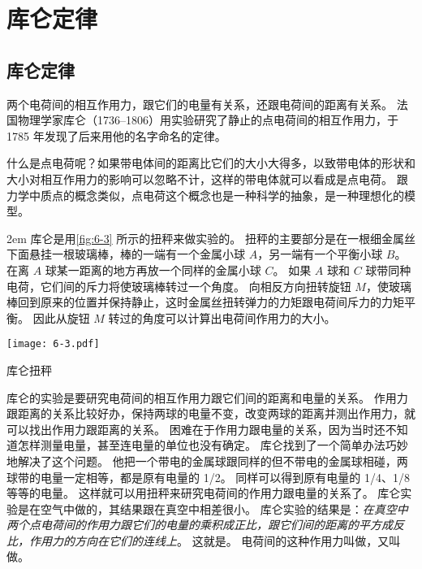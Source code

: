 \section{库仑定律}
\subsection{库仑定律} 
两个电荷间的相互作用力，跟它们的电量有关系，还跟电荷间的距离有关系。
法国物理学家库仑（1736--1806）用实验研究了静止的点电荷间的相互作用力，于 1785 年发现了后来用他的名字命名的定律。

什么是点电荷呢？如果带电体间的距离比它们的大小大得多，以致带电体的形状和大小对相互作用力的影响可以忽略不计，这样的带电体就可以看成是点电荷。
跟力学中质点的概念类似，点电荷这个概念也是一种科学的抽象，是一种理想化的模型。

\medskip\noindent
\begin{minipage}{0.55\linewidth}\parindent2em
库仑是用\cref{fig:6-3} 所示的扭秤来做实验的。
扭秤的主要部分是在一根细金属丝下面悬挂一根玻璃棒，棒的一端有一个金属小球 $A$，另一端有一个平衡小球 $B$。
在离 $A$ 球某一距离的地方再放一个同样的金属小球 $C$。
如果 $A$ 球和 $C$ 球带同种电荷，它们间的斥力将使玻璃棒转过一个角度。
向相反方向扭转旋钮 $M$，使玻璃棒回到原来的位置并保持静止，这时金属丝扭转弹力的力矩跟电荷间斥力的力矩平衡。
因此从旋钮 $M$ 转过的角度可以计算出电荷间作用力的大小。
\end{minipage}\hfill
\begin{minipage}{0.4\linewidth}\centering
	\begin{figurehere}
		\texttt{[image: 6-3.pdf]}
		\caption{库仑扭秤}\label{fig:6-3}
	\end{figurehere}
\end{minipage}

\medskip
库仑的实验是要研究电荷间的相互作用力跟它们间的距离和电量的关系。
作用力跟距离的关系比较好办，保持两球的电量不变，改变两球的距离并测出作用力，就可以找出作用力跟距离的关系。
困难在于作用力跟电量的关系，因为当时还不知道怎样测量电量，甚至连电量的单位也没有确定。
库仑找到了一个简单办法巧妙地解决了这个问题。
他把一个带电的金属球跟同样的但不带电的金属球相碰，两球带的电量一定相等，都是原有电量的 1/2。
同样可以得到原有电量的 1/4、1/8 等等的电量。
这样就可以用扭秤来研究电荷间的作用力跟电量的关系了。
库仑实验是在空气中做的，其结果跟在真空中相差很小。
库仑实验的结果是：\emph{在真空中两个点电荷间的作用力跟它们的电量的乘积成正比，跟它们间的距离的平方成反比，作用力的方向在它们的连线上}。
这就是。
电荷间的这种作用力叫做，又叫做。

